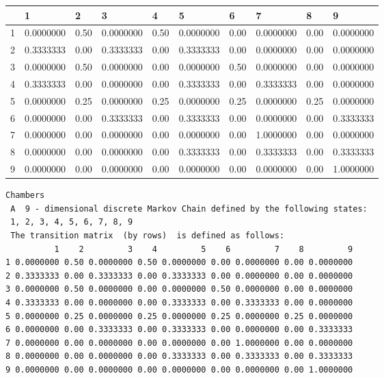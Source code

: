 \documentclass[11pt]{article}
\begin{document}
    \begin{tabular}{r|lllllllll}
  & 1 & 2 & 3 & 4 & 5 & 6 & 7 & 8 & 9\\
\hline
	1 & 0.0000000 & 0.50      & 0.0000000 & 0.50      & 0.0000000 & 0.00      & 0.0000000 & 0.00      & 0.0000000\\
	2 & 0.3333333 & 0.00      & 0.3333333 & 0.00      & 0.3333333 & 0.00      & 0.0000000 & 0.00      & 0.0000000\\
	3 & 0.0000000 & 0.50      & 0.0000000 & 0.00      & 0.0000000 & 0.50      & 0.0000000 & 0.00      & 0.0000000\\
	4 & 0.3333333 & 0.00      & 0.0000000 & 0.00      & 0.3333333 & 0.00      & 0.3333333 & 0.00      & 0.0000000\\
	5 & 0.0000000 & 0.25      & 0.0000000 & 0.25      & 0.0000000 & 0.25      & 0.0000000 & 0.25      & 0.0000000\\
	6 & 0.0000000 & 0.00      & 0.3333333 & 0.00      & 0.3333333 & 0.00      & 0.0000000 & 0.00      & 0.3333333\\
	7 & 0.0000000 & 0.00      & 0.0000000 & 0.00      & 0.0000000 & 0.00      & 1.0000000 & 0.00      & 0.0000000\\
	8 & 0.0000000 & 0.00      & 0.0000000 & 0.00      & 0.3333333 & 0.00      & 0.3333333 & 0.00      & 0.3333333\\
	9 & 0.0000000 & 0.00      & 0.0000000 & 0.00      & 0.0000000 & 0.00      & 0.0000000 & 0.00      & 1.0000000\\
\end{tabular}


    
    
    \begin{verbatim}
Chambers 
 A  9 - dimensional discrete Markov Chain defined by the following states: 
 1, 2, 3, 4, 5, 6, 7, 8, 9 
 The transition matrix  (by rows)  is defined as follows: 
          1    2         3    4         5    6         7    8         9
1 0.0000000 0.50 0.0000000 0.50 0.0000000 0.00 0.0000000 0.00 0.0000000
2 0.3333333 0.00 0.3333333 0.00 0.3333333 0.00 0.0000000 0.00 0.0000000
3 0.0000000 0.50 0.0000000 0.00 0.0000000 0.50 0.0000000 0.00 0.0000000
4 0.3333333 0.00 0.0000000 0.00 0.3333333 0.00 0.3333333 0.00 0.0000000
5 0.0000000 0.25 0.0000000 0.25 0.0000000 0.25 0.0000000 0.25 0.0000000
6 0.0000000 0.00 0.3333333 0.00 0.3333333 0.00 0.0000000 0.00 0.3333333
7 0.0000000 0.00 0.0000000 0.00 0.0000000 0.00 1.0000000 0.00 0.0000000
8 0.0000000 0.00 0.0000000 0.00 0.3333333 0.00 0.3333333 0.00 0.3333333
9 0.0000000 0.00 0.0000000 0.00 0.0000000 0.00 0.0000000 0.00 1.0000000

    \end{verbatim}
\end{document}
